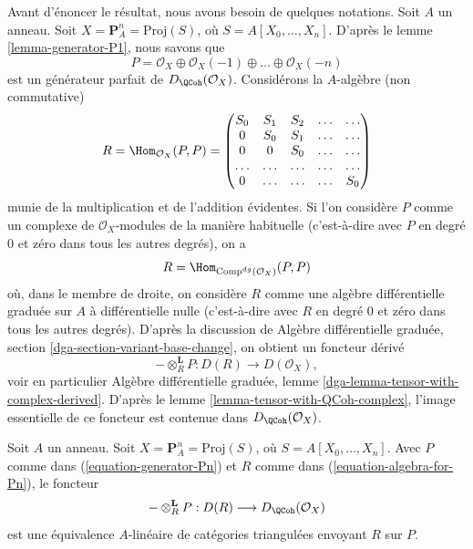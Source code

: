 \medskip\noindent
Avant d'énoncer le résultat, nous avons besoin de quelques notations.
Soit $A$ un anneau. Soit $X = \mathbf{P}^n_A = \text{Proj}(S)$,
où $S = A[X_0, \ldots, X_n]$. D'après le lemme \ref{lemma-generator-P1},
nous savons que
\begin{equation}
\label{equation-generator-Pn}
P =
\mathcal{O}_X \oplus \mathcal{O}_X(-1) \oplus \ldots \oplus \mathcal{O}_X(-n)
\end{equation}
est un générateur parfait de $D_\QCoh(\mathcal{O}_X)$.
Considérons la $A$-algèbre (non commutative)
\begin{equation}
\label{equation-algebra-for-Pn}
R = \Hom_{\mathcal{O}_X}(P, P) =
\left(
\begin{matrix}
S_0 & S_1 & S_2 & \ldots & \ldots \\
0 & S_0 & S_1 & \ldots & \ldots\\
0 & 0 & S_0 & \ldots & \ldots \\
\ldots & \ldots & \ldots & \ldots & \ldots \\
0 & \ldots & \ldots & \ldots & S_0
\end{matrix}
\right)
\end{equation}
munie de la multiplication et de l'addition évidentes. Si l'on considère $P$ comme un complexe
de $\mathcal{O}_X$-modules de la manière habituelle (c'est-à-dire avec $P$ en degré $0$
et zéro dans tous les autres degrés), on a
$$
R = \Hom_{\text{Comp}^{dg}(\mathcal{O}_X)}(P, P)
$$
où, dans le membre de droite, on considère $R$ comme une algèbre différentielle graduée
sur $A$
à différentielle nulle (c'est-à-dire avec $R$ en degré $0$ et zéro dans tous
les autres degrés). D'après la discussion de
Algèbre différentielle graduée, section \ref{dga-section-variant-base-change},
on obtient un foncteur dérivé
$$
- \otimes_R^\mathbf{L} P : D(R) \longrightarrow D(\mathcal{O}_X),
$$
voir en particulier Algèbre différentielle graduée, lemme
\ref{dga-lemma-tensor-with-complex-derived}.
D'après le lemme \ref{lemma-tensor-with-QCoh-complex},
l'image essentielle de ce foncteur
est contenue dans $D_\QCoh(\mathcal{O}_X)$.

\begin{lemma}
\label{lemma-Pn-module-category}
\begin{reference}
\cite{Beilinson}
\end{reference}
Soit $A$ un anneau. Soit $X = \mathbf{P}^n_A = \text{Proj}(S)$,
où $S = A[X_0, \ldots, X_n]$. Avec
$P$ comme dans (\ref{equation-generator-Pn}) et
$R$ comme dans (\ref{equation-algebra-for-Pn}),
le foncteur
$$
- \otimes_R^\mathbf{L} P : D(R) \longrightarrow D_\QCoh(\mathcal{O}_X)
$$
est une équivalence $A$-linéaire de catégories triangulées envoyant $R$
sur $P$.
\end{lemma}

